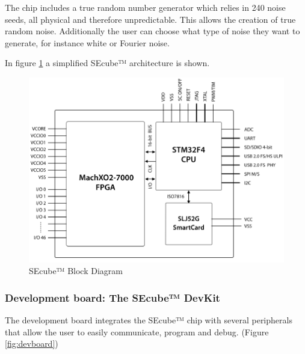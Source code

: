 The chip includes a true random number generator which relies in 240 noise seeds, all physical and therefore unpredictable. This allows the creation of true random noise. Additionally the user can choose what type of noise they want to generate, for instance white or Fourier noise.


In figure \ref{fig:SEcubeBD} a simplified SEcube™ architecture is shown.

\begin{figure}[ht]
	\centering
	\includegraphics[width=\textwidth]{chapters/figures/development/SEcubeBlocks.png}
	\caption{SEcube™ Block Diagram}
	\label{fig:SEcubeBD}
\end{figure}


\subsubsection{Development board: The SEcube™ DevKit}

The development board integrates the SEcube™ chip with several peripherals that allow the user to easily communicate, program and debug. (Figure \ref{fig:devboard})

